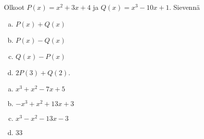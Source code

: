 \begin{tehtavasivu}

\begin{tehtava}
    Olkoot $P(x)=x^2+3x+4$ ja $Q(x)=x^3-10x+1$. Sievennä
    \begin{enumerate}[a)]
        \item $P(x)+Q(x)$
        \item $P(x)-Q(x)$
        \item $Q(x)-P(x)$
        \item $2P(3)+Q(2)$.
    \end{enumerate}
    \begin{vastaus}
        \begin{enumerate}[a)]
            \item $x^3+x^2-7x+5$ %
            \item $-x^3+x^2+13x+3$ %
            \item $x^3-x^2-13x-3$ %
            \item $33$ %
        \end{enumerate}
    \end{vastaus}
\end{tehtava}


\end{tehtavasivu}
